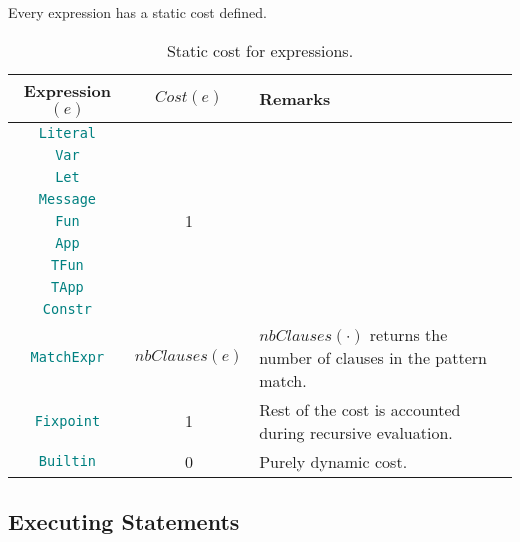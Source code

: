 \documentclass[9pt]{article}
\begin{document}
Every expression has a static cost defined. 

\begin{table}[!hbt]
	\caption{Static cost for expressions. \label{tab:expressions} }
\centering
	\begin{tabular}{|c|c|p{6cm}|}
	\hline
		\textbf{Expression $(e)$} & \textbf{$Cost(e)$} & \textbf{Remarks} \\ \hline
		\texttt{\textcolor{teal}{Literal}}  & \multirow{9}{*}{1}  & \\
		\cline{1-1}
		\texttt{\textcolor{teal}{Var}}  &  & \\ \cline{1-1}
		\texttt{\textcolor{teal}{Let}}  &  & \\ \cline{1-1}
		\texttt{\textcolor{teal}{Message}}  &  & \\ \cline{1-1}
		\texttt{\textcolor{teal}{Fun}}  &  & \\ \cline{1-1}
		\texttt{\textcolor{teal}{App}}  &  & \\ \cline{1-1}
		\texttt{\textcolor{teal}{TFun}}  &  & \\ \cline{1-1}
		\texttt{\textcolor{teal}{TApp}}  &  & \\ \cline{1-1}
		\texttt{\textcolor{teal}{Constr}}  &  & \\ \hline
		\texttt{\textcolor{teal}{MatchExpr}}  & $nbClauses(e)$
		&$nbClauses(\cdot)$ returns the number of clauses in the pattern match.
		 \\ \hline
		\texttt{\textcolor{teal}{Fixpoint}}  & 1  & Rest of the cost is
		accounted during recursive evaluation. \\ \hline
		\texttt{\textcolor{teal}{Builtin}}  & 0 & Purely dynamic cost. \\ \hline
	\end{tabular}
	\end{table}
 

\subsection{Executing Statements}
\end{document}
